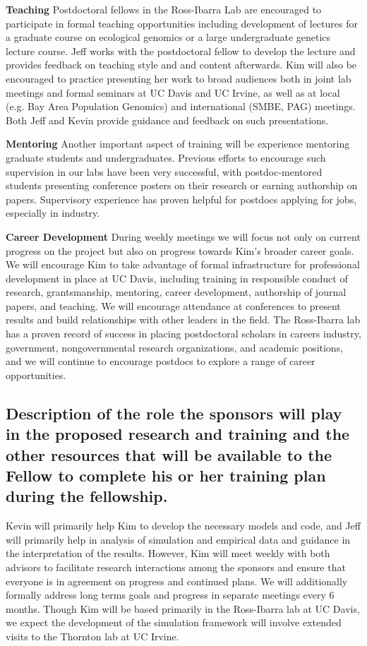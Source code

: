 \textbf{Teaching}  Postdoctoral fellows in the Ross-Ibarra Lab are encouraged to participate in formal teaching opportunities including development of lectures for a graduate course on ecological genomics or a large undergraduate genetics lecture course.  Jeff works with the postdoctoral fellow to develop the lecture and provides feedback on teaching style and and content afterwards. Kim will also be encouraged to practice presenting her work to broad audiences both in joint lab meetings and formal seminars at UC Davis and UC Irvine, as well as at local (e.g. Bay Area Population Genomics) and international (SMBE, PAG) meetings. Both Jeff and Kevin provide guidance and feedback on such presentations.

\textbf{Mentoring}
Another important aspect of training will be experience mentoring graduate students and undergraduates.  Previous efforts to encourage such supervision in our labs have been very successful, with postdoc-mentored students presenting conference posters on their research or earning authorship on papers.  Supervisory experience has proven helpful for postdocs applying for jobs, especially in industry.

\textbf{Career Development}
During weekly  meetings we will focus not only on current progress on the project but also on progress  towards Kim's broader career goals. We will encourage Kim to take advantage of formal infrastructure for professional development in place at UC Davis, including training in responsible conduct of research, grantsmanship, mentoring, career development, authorship of journal papers, and teaching. We will encourage attendance at conferences to present results and build relationships with other leaders in the field. The Ross-Ibarra lab has a proven record of success in placing postdoctoral scholars in careers industry, government, nongovernmental research organizations, and academic positions, and we will continue to encourage postdocs to explore a range of career opportunities.


\subsection{Description of the role the sponsors will play in the proposed research and training and the other resources that will be available to the Fellow to complete his or her training plan during the fellowship.}

Kevin will primarily help Kim to develop the necessary models and code, and Jeff will primarily help in analysis of simulation and empirical data and guidance in the interpretation of the results. 
However, Kim will meet weekly with both advisors to facilitate research interactions among the sponsors and ensure that everyone is in agreement on progress and continued plans.   We will additionally formally address long terms goals and progress in separate meetings every 6 months. Though Kim will be based primarily in the Ross-Ibarra lab at UC Davis, we expect the development of the simulation framework will involve extended visits to the Thornton lab at UC Irvine.

